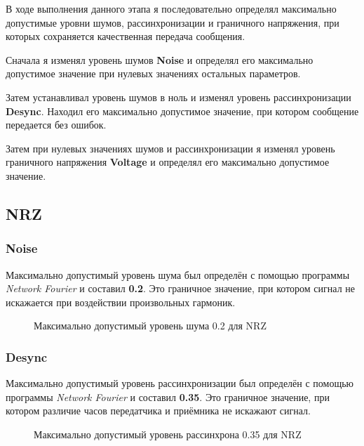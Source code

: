 В ходе выполнения данного этапа я последовательно определял максимально допустимые уровни шумов, рассинхронизации и граничного напряжения, при которых сохраняется качественная передача сообщения.

Сначала я изменял уровень шумов \textbf{Noise} и определял его максимально допустимое значение при нулевых значениях остальных параметров.

Затем устанавливал уровень шумов в ноль и изменял уровень рассинхронизации \textbf{Desync}. Находил его максимально допустимое значение, при котором сообщение передается без ошибок.

Затем при нулевых значениях шумов и рассинхронизации я изменял уровень граничного напряжения \textbf{Voltage} и определял его максимально допустимое значение.


\subsection{NRZ}

\subsubsection{Noise}

Максимально допустимый уровень шума был определён с помощью программы \textit{Network Fourier} и составил \textbf{0.2}. Это граничное значение, при котором сигнал не искажается при воздействии произвольных гармоник.

\vspace{0.4cm}
\begin{figure}[h]
	\centering
	\caption{Максимально допустимый уровень шума 0.2 для NRZ}
\end{figure}

\subsubsection{Desync}

Максимально допустимый уровень рассинхронизации был определён с помощью программы \textit{Network Fourier} и составил \textbf{0.35}. Это граничное значение, при котором различие часов передатчика и приёмника не искажают сигнал.

\vspace{0.4cm}
\begin{figure}[h]
	\centering
	\caption{Максимально допустимый уровень рассинхрона 0.35 для NRZ}
\end{figure}

